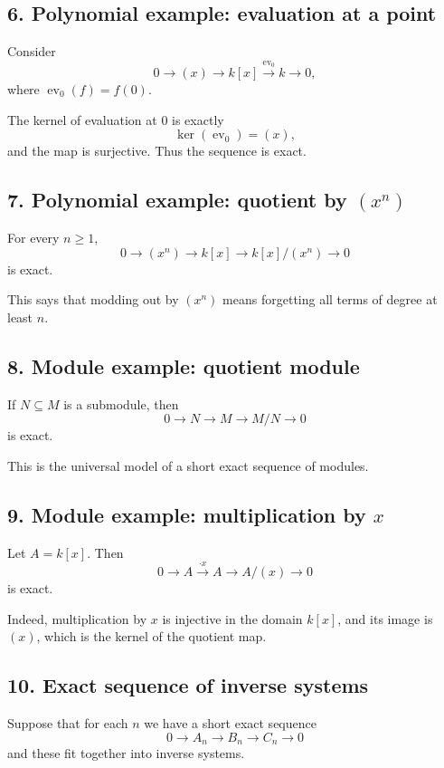 \documentclass[12pt,a4paper]{article}
\theoremstyle{plain}
\theoremstyle{definition}      %
\begin{document}
	\subsection*{6. Polynomial example: evaluation at a point}
	
	Consider
	\[
	0\to (x)\to k[x]\xrightarrow{\operatorname{ev}_0} k\to 0,
	\]
	where \(\operatorname{ev}_0(f)=f(0)\).
	
	The kernel of evaluation at \(0\) is exactly
	\[
	\ker(\operatorname{ev}_0)=(x),
	\]
	and the map is surjective. Thus the sequence is exact.
	
	\subsection*{7. Polynomial example: quotient by \((x^n)\)}
	
	For every \(n\ge 1\),
	\[
	0\to (x^n)\to k[x]\to k[x]/(x^n)\to 0
	\]
	is exact.
	
	This says that modding out by \((x^n)\) means forgetting all terms of degree at least \(n\).
	
	\subsection*{8. Module example: quotient module}
	
	If \(N\subseteq M\) is a submodule, then
	\[
	0\to N\to M\to M/N\to 0
	\]
	is exact.
	
	This is the universal model of a short exact sequence of modules.
	
	\subsection*{9. Module example: multiplication by \(x\)}
	
	Let \(A=k[x]\). Then
	\[
	0\to A\xrightarrow{\cdot x} A\to A/(x)\to 0
	\]
	is exact.
	
	Indeed, multiplication by \(x\) is injective in the domain \(k[x]\), and its image is \((x)\), which is the kernel of the quotient map.
	
	\subsection*{10. Exact sequence of inverse systems}
	
	Suppose that for each \(n\) we have a short exact sequence
	\[
	0\to A_n\to B_n\to C_n\to 0
	\]
	and these fit together into inverse systems.
	
\end{document}
